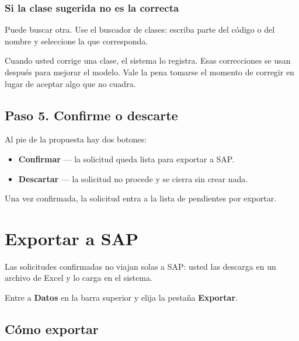 \subsubsection*{Si la clase sugerida no es la correcta}

Puede buscar otra. Use el buscador de clases: escriba parte del código o del
nombre y seleccione la que corresponda.


\begin{nota}
Cuando usted corrige una clase, el sistema lo registra. Esas correcciones se
usan después para mejorar el modelo. Vale la pena tomarse el momento de
corregir en lugar de aceptar algo que no cuadra.
\end{nota}

\subsection{Paso 5. Confirme o descarte}

Al pie de la propuesta hay dos botones:

\begin{itemize}[leftmargin=*, itemsep=3pt]
  \item \textbf{Confirmar} — la solicitud queda lista para exportar a SAP.
  \item \textbf{Descartar} — la solicitud no procede y se cierra sin crear nada.
\end{itemize}


Una vez confirmada, la solicitud entra a la lista de pendientes por exportar.

\newpage
\section{Exportar a SAP}

Las solicitudes confirmadas no viajan solas a SAP: usted las descarga en un
archivo de Excel y lo carga en el sistema.

Entre a \textbf{Datos} en la barra superior y elija la pestaña
\textbf{Exportar}.


\subsection{Cómo exportar}

